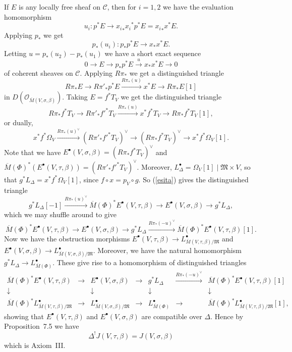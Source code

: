 \documentclass[11pt]{article}
\newcommand{\MM}{\mathfrak{M}}
\renewcommand{\O}{\mathcal{O}}
\newcommand{\cC}{\mathcal{C}}
\newcommand{\com}{^{\scriptscriptstyle\bullet}}
\newcommand{\comp}{\mathbin{{\scriptstyle\circ}}}
\newcommand{\dt}[6]{#1\stackrel{#2}{\longrightarrow}#3 \stackrel{#4}{\longrightarrow}#5
\stackrel{#6}{\longrightarrow} #1[1]}
\newcommand{\dual}[1]{{{#1}^{\vee}}}
\newcommand{\lst}{_{\ast}}
\newcommand{\ol}{\overline}
\newcommand{\resto}{{ \mid }}
\newcommand{\ses}[5]{0\longrightarrow#1\stackrel{#2}{ \longrightarrow}#3\stackrel{#4}{
\longrightarrow}#5\longrightarrow0}
\newcommand{\upsh}{^{!}}
\newcommand{\upst}{^{\ast}}
\theoremstyle{plain}
\theoremstyle{remark}
\theoremstyle{plain}
\theoremstyle{definition}
\theoremstyle{remark}
\begin{document}
If \(E\) is any locally free sheaf on \(\cC\), then for \(i=1,2\) we have
the evaluation homomorphism
\[
u_i:p\upst E\longrightarrow {x_i}\lst{x_i}\upst p\upst E = {x_i}\lst
x\upst E.
\]
Applying \(p\lst\) we get
\[
p\lst(u_i):p\lst p\upst E\longrightarrow x\lst x\upst E.
\]
Letting \(u=p\lst(u_2)-p\lst(u_1)\) we have a short exact sequence
\[
\ses{E}{}{p\lst p\upst E}{u}{x\lst x\upst E}
\]
of coherent sheaves on \(\cC\). Applying \(R\pi\lst\) we get a
distinguished triangle
\[
\dt{R\pi\lst E}{}{ R\pi'\lst p\upst E}{R\pi\lst(u)}{x\upst E}{}
\]
in \(D(\O_{\ol{M}(V,\sigma,\beta)})\). Taking \(E=f\upst T_V\) we get the
distinguished triangle
\[
\dt{R\pi\lst f\upst T_V}{}{ R\pi'\lst {f'}\upst
T_V}{R\pi\lst(u)}{x\upst f\upst T_V}{},
\]
or dually,
\begin{equation}
\label{esita}
\dt{x\upst f\upst \Omega_V}{\dual{R\pi\lst(u)}}{\dual{(R\pi'\lst
{f'}\upst T_V)}}{}{\dual{(R\pi\lst f\upst T_V)}}{}.
\end{equation}
Note that we have \(E\com(V,\sigma,\beta)=\dual{(R\pi\lst f\upst T_V)}\)
and \(\ol{M}(\Phi)\upst(E\com(V,\tau,\beta))=\dual{(R\pi'\lst{f'}\upst
T_V)}\). Moreover, \(L_{\Delta}\com=\Omega_V[1]\resto\MM\times V\), so
that \(g\upst L_{\Delta}=x\upst f\upst \Omega_V[1]\), since \(f\comp
x=p_V\comp g\). So (\ref{esita}) gives the distinguished triangle
\[
{g\upst
L_{\Delta}[-1]}\stackrel{\dual{R\pi\lst(u)}}{\longrightarrow}
{\ol{M}(\Phi)\upst
E\com(V,\tau,\beta)}{\longrightarrow}{E\com(V,\sigma,\beta)}{\longrightarrow}
g\upst L_{\Delta},
\]
which we may shuffle around to give
\[
\dt{\ol{M}(\Phi)\upst
E\com(V,\tau,\beta)}{}{E\com(V,\sigma,\beta)}{}{g\upst
L_{\Delta}}{\dual{R\pi\lst(-u)}}.
\]
Now we have the obstruction morphisms \(E\com(V,\tau,\beta)\to
L\com_{\ol{M}(V,\tau,\beta)/\MM}\) and \(E\com(V,\sigma,\beta)\to
L\com_{\ol{M}(V,\sigma,\beta)/\MM}\). Moreover, we have the natural
homomorphism \(g\upst L_{\Delta}\to L\com_{\ol{M}(\Phi)}\). These give
rise to a homomorphism of distinguished triangles
\[
\begin{array}{ccccccc}
\ol{M}(\Phi)\upst E\com(V,\tau,\beta) & \longrightarrow &
E\com(V,\sigma,\beta) & \longrightarrow & g\upst L_{\Delta} &
\stackrel{\dual{R\pi\lst(-u)}}{\longrightarrow} & \ol{M}(\Phi)\upst
E\com(V,\tau,\beta)[1]\\
\downarrow & & \downarrow & &\downarrow & &\downarrow \\
\ol{M}(\Phi)\upst L\com_{\ol{M}(V,\tau,\beta)/\MM} & \longrightarrow &
L\com_{\ol{M}(V,\sigma,\beta)/\MM} & \longrightarrow &
L\com_{\ol{M}(\Phi)} & \longrightarrow & \ol{M}(\Phi)\upst
L\com_{\ol{M}(V,\tau,\beta)/\MM}[1],
\end{array}
\]
showing that \(E\com(V,\tau,\beta)\) and \(E\com(V,\sigma,\beta)\) are
compatible over \(\Delta\).
Hence by \cite{BF} Proposition~7.5 we have
\[
\Delta\upsh J(V,\tau,\beta)=J(V,\sigma,\beta)
\]
which is Axiom~III.
\end{document}
